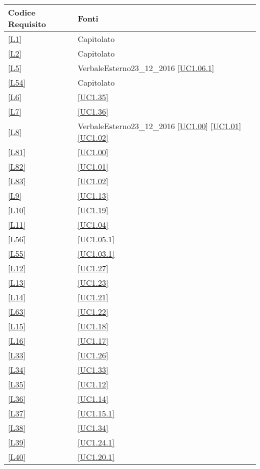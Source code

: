 \begin{longtable}{|P{6cm}|P{6cm}|}
	\hline \textbf{Codice Requisito} & \textbf{Fonti}\\
	\hline \ref{L1} & Capitolato \\
	\hline \ref{L2} & Capitolato \\
	\hline \ref{L5} & VerbaleEsterno23\_12\_2016 \linebreak \ref{UC1.06.1}  \\	
	\hline \ref{L54} & Capitolato \\
	\hline \ref{L6} & \ref{UC1.35} \\
	\hline \ref{L7} & \ref{UC1.36} \\
	\hline \ref{L8} & VerbaleEsterno23\_12\_2016 \linebreak \ref{UC1.00} \linebreak \ref{UC1.01} \linebreak \ref{UC1.02} \\
	\hline \ref{L81} & \ref{UC1.00} \\
	\hline \ref{L82} & \ref{UC1.01} \\
	\hline \ref{L83} & \ref{UC1.02} \\
	\hline \ref{L9} & \ref{UC1.13} \\
	\hline \ref{L10} & \ref{UC1.19} \\
	\hline \ref{L11} & \ref{UC1.04}  \\
	\hline \ref{L56} & \ref{UC1.05.1} \\
	\hline \ref{L55} & \ref{UC1.03.1} \\
	\hline \ref{L12} & \ref{UC1.27} \\
	\hline \ref{L13} & \ref{UC1.23} \\
	\hline \ref{L14} & \ref{UC1.21} \\
	\hline \ref{L63} & \ref{UC1.22} \\
	\hline \ref{L15} & \ref{UC1.18} \\
	\hline \ref{L16} & \ref{UC1.17} \\
	\hline \ref{L33} & \ref{UC1.26} \\
	\hline \ref{L34} & \ref{UC1.33} \\
	\hline \ref{L35} & \ref{UC1.12} \\
	\hline \ref{L36} & \ref{UC1.14} \\
	\hline \ref{L37} & \ref{UC1.15.1} \\
	\hline \ref{L38} & \ref{UC1.34} \\
	\hline \ref{L39} & \ref{UC1.24.1} \\
	\hline \ref{L40} & \ref{UC1.20.1} \\	

\end{longtable}
